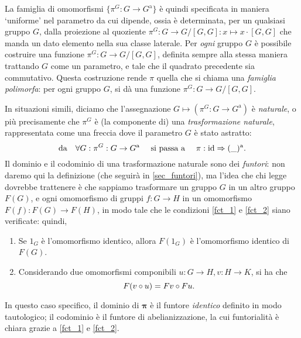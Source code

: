 La famiglia di omomorfismi \(\{\pi^G : G\to G^\text{a}\}\) è quindi specificata in maniera `uniforme' nel parametro da cui dipende, ossia è determinata, per un qualsiasi gruppo \(G\), dalla proiezione al quoziente \(\pi^G : G\to G/[G,G] : x\mapsto x\cdot[G,G]\) che manda un dato elemento nella sua classe laterale. Per \emph{ogni} gruppo \(G\) è possibile costruire una funzione \(\pi^G : G\to G/[G,G]\), definita sempre alla stessa maniera trattando \(G\) come un parametro, e tale che il quadrato precedente sia commutativo. Questa costruzione rende \(\pi\) quella che si chiama una \emph{famiglia polimorfa}: per ogni gruppo \(G\), si dà una funzione \(\pi^G : G\to G/[G,G]\).

In situazioni simili, diciamo che l'assegnazione \(G\mapsto (\pi^G : G\to G^\text{a})\) è \emph{naturale}, o più precisamente che \(\pi^G\) è (la componente di) una \emph{trasformazione naturale}, rappresentata come una freccia dove il parametro \(G\) è stato astratto:
\[\text{da}\quad\forall G : \pi^G : G\to G^\text{a} \quad \text{ si passa a }
	\quad\pi : \mathrm{id} \Rightarrow (\_)^\text{a}.\]
Il dominio e il codominio di una trasformazione naturale sono dei \emph{funtori}: non daremo qui la definizione (che seguirà in \ref{sec_funtori}), ma l'idea che chi legge dovrebbe trattenere è che sappiamo trasformare un gruppo \(G\) in un altro gruppo \(F(G)\), e ogni omomorfismo di gruppi \(f : G\to H\) in un omomorfismo \(F(f) : F(G)\to F(H)\), in modo tale che le condizioni \ref{fct_1} e \ref{fct_2} siano verificate: quindi,
\begin{enumerate}
	\item Se \(1_G\) è l'omomorfismo identico, allora \(F(1_G)\) è l'omomorfismo identico di \(F(G)\).
	\item Considerando due omomorfismi componibili \(u : G\to H, v : H\to K\), si ha che
	      \[F(v\circ u) = Fv \circ Fu.\]
\end{enumerate}
In questo caso specifico, il dominio di \(\boldsymbol\pi\) è il funtore \emph{identico} definito in modo tautologico; il codominio è il funtore di abelianizzazione, la cui funtorialità è chiara grazie a \ref{fct_1} e \ref{fct_2}.

